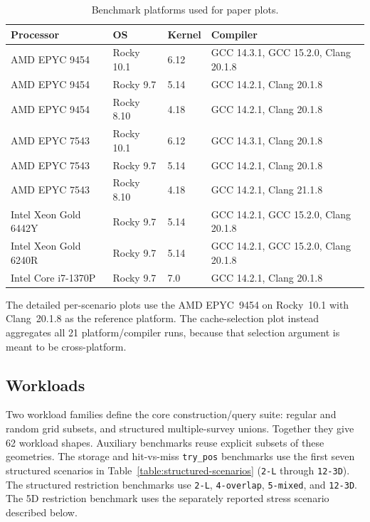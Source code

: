 \documentclass[manuscript,screen,review]{acmart}
\theoremstyle{definition}
\theoremstyle{plain}
\begin{document}
\begin{table}[ht]
\caption{Benchmark platforms used for paper plots.}
\label{table:platforms}
\begin{tabular}{llll}
\toprule
Processor & OS & Kernel & Compiler \\
\midrule
AMD EPYC 9454
  & Rocky 10.1 & 6.12
  & GCC 14.3.1, GCC 15.2.0, Clang 20.1.8 \\
AMD EPYC 9454
  & Rocky 9.7 & 5.14
  & GCC 14.2.1, Clang 20.1.8 \\
AMD EPYC 9454
  & Rocky 8.10 & 4.18
  & GCC 14.2.1, Clang 20.1.8 \\
AMD EPYC 7543
  & Rocky 10.1 & 6.12
  & GCC 14.3.1, Clang 20.1.8 \\
AMD EPYC 7543
  & Rocky 9.7 & 5.14
  & GCC 14.2.1, Clang 20.1.8 \\
AMD EPYC 7543
  & Rocky 8.10 & 4.18
  & GCC 14.2.1, Clang 21.1.8 \\
Intel Xeon Gold 6442Y
  & Rocky 9.7 & 5.14
  & GCC 14.2.1, GCC 15.2.0, Clang 20.1.8 \\
Intel Xeon Gold 6240R
  & Rocky 9.7 & 5.14
  & GCC 14.2.1, GCC 15.2.0, Clang 20.1.8 \\
Intel Core i7-1370P
  & Rocky 9.7 & 7.0
  & GCC 14.2.1, Clang 20.1.8 \\
\bottomrule
\end{tabular}
\end{table}

The detailed per-scenario plots use the AMD EPYC~9454 on Rocky~10.1 with
Clang~20.1.8 as the reference platform.
The cache-selection plot instead aggregates all 21 platform/compiler
runs, because that selection argument is meant to be cross-platform.

\subsection{Workloads}
\label{section:workloads}

Two workload families define the core construction/query suite: regular
and random grid subsets, and structured multiple-survey unions.
Together they give 62 workload shapes. Auxiliary benchmarks reuse
explicit subsets of these geometries. The storage and hit-vs-miss
\texttt{try\_pos} benchmarks use the first seven structured scenarios
in Table~\ref{table:structured-scenarios} (\texttt{2-L} through
\texttt{12-3D}). The structured restriction
benchmarks use \texttt{2-L}, \texttt{4-overlap}, \texttt{5-mixed}, and
\texttt{12-3D}. The 5D restriction benchmark uses the separately
reported stress scenario described below.
\end{document}
